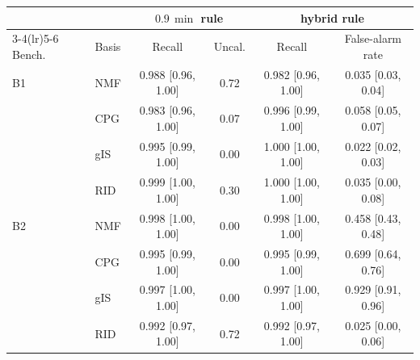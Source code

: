 \begin{tabular}{@{}llcccc@{}}
\toprule
 & & \multicolumn{2}{c}{$0.9\,\min$ rule} & \multicolumn{2}{c}{hybrid rule} \\
\cmidrule(lr){3-4}\cmidrule(lr){5-6}
Bench. & Basis & Recall & Uncal. & Recall & False-alarm rate \\
\midrule
B1 & NMF & 0.988 [0.96, 1.00] & 0.72 & 0.982 [0.96, 1.00] & 0.035 [0.03, 0.04] \\
 & CPG & 0.983 [0.96, 1.00] & 0.07 & 0.996 [0.99, 1.00] & 0.058 [0.05, 0.07] \\
 & gIS & 0.995 [0.99, 1.00] & 0.00 & 1.000 [1.00, 1.00] & 0.022 [0.02, 0.03] \\
 & RID & 0.999 [1.00, 1.00] & 0.30 & 1.000 [1.00, 1.00] & 0.035 [0.00, 0.08] \\
\midrule
B2 & NMF & 0.998 [1.00, 1.00] & 0.00 & 0.998 [1.00, 1.00] & 0.458 [0.43, 0.48] \\
 & CPG & 0.995 [0.99, 1.00] & 0.00 & 0.995 [0.99, 1.00] & 0.699 [0.64, 0.76] \\
 & gIS & 0.997 [1.00, 1.00] & 0.00 & 0.997 [1.00, 1.00] & 0.929 [0.91, 0.96] \\
 & RID & 0.992 [0.97, 1.00] & 0.72 & 0.992 [0.97, 1.00] & 0.025 [0.00, 0.06] \\
\bottomrule
\end{tabular}
